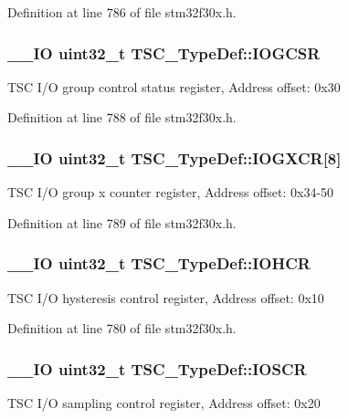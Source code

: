 Definition at line 786 of file stm32f30x.\-h.

\hypertarget{struct_t_s_c___type_def_aa166b00195900a37903238cc8d50ba36}{
\subsubsection[{I\-O\-G\-C\-S\-R}]{\setlength{\rightskip}{0pt plus 5cm}\-\_\-\-\_\-\-I\-O {\bf uint32\-\_\-t} T\-S\-C\-\_\-\-Type\-Def\-::\-I\-O\-G\-C\-S\-R}}\label{struct_t_s_c___type_def_aa166b00195900a37903238cc8d50ba36}
T\-S\-C I/\-O group control status register, Address offset\-: 0x30 

Definition at line 788 of file stm32f30x.\-h.

\hypertarget{struct_t_s_c___type_def_a67d0b2e4315451b591e3d6b09c6c9cfc}{
\subsubsection[{I\-O\-G\-X\-C\-R}]{\setlength{\rightskip}{0pt plus 5cm}\-\_\-\-\_\-\-I\-O {\bf uint32\-\_\-t} T\-S\-C\-\_\-\-Type\-Def\-::\-I\-O\-G\-X\-C\-R\mbox{[}8\mbox{]}}}\label{struct_t_s_c___type_def_a67d0b2e4315451b591e3d6b09c6c9cfc}
T\-S\-C I/\-O group x counter register, Address offset\-: 0x34-\/50 

Definition at line 789 of file stm32f30x.\-h.

\hypertarget{struct_t_s_c___type_def_a715fd9205b604d1dda5046a31996296a}{
\subsubsection[{I\-O\-H\-C\-R}]{\setlength{\rightskip}{0pt plus 5cm}\-\_\-\-\_\-\-I\-O {\bf uint32\-\_\-t} T\-S\-C\-\_\-\-Type\-Def\-::\-I\-O\-H\-C\-R}}\label{struct_t_s_c___type_def_a715fd9205b604d1dda5046a31996296a}
T\-S\-C I/\-O hysteresis control register, Address offset\-: 0x10 

Definition at line 780 of file stm32f30x.\-h.

\hypertarget{struct_t_s_c___type_def_a95191a7f002c8738f835ffbb356e28c6}{
\subsubsection[{I\-O\-S\-C\-R}]{\setlength{\rightskip}{0pt plus 5cm}\-\_\-\-\_\-\-I\-O {\bf uint32\-\_\-t} T\-S\-C\-\_\-\-Type\-Def\-::\-I\-O\-S\-C\-R}}\label{struct_t_s_c___type_def_a95191a7f002c8738f835ffbb356e28c6}
T\-S\-C I/\-O sampling control register, Address offset\-: 0x20 

